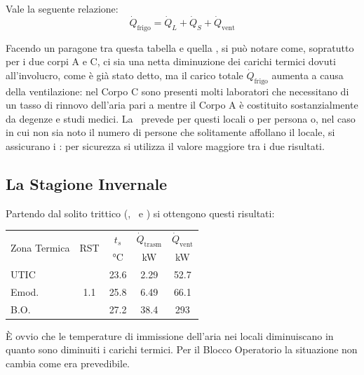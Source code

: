 Vale la seguente relazione:
\begin{equation}
	\dot{Q}_{\mathrm{frigo}}=\dot{Q}_L+\dot{Q}_S+\dot{Q}_{\mathrm{vent}}
\end{equation}

Facendo un paragone tra questa tabella e quella , si può notare come, sopratutto per i due corpi A e C, ci sia una netta diminuzione dei carichi termici dovuti all'involucro, come è già stato detto, ma il carico totale $\dot{Q}_{\mathrm{frigo}}$ aumenta a causa della ventilazione: nel Corpo C sono presenti molti laboratori che necessitano di un tasso di rinnovo dell'aria pari a  mentre il Corpo A è costituito sostanzialmente da degenze e studi medici. La \norvent\ prevede per questi locali o  per persona o, nel caso in cui non sia noto il numero di persone che solitamente affollano il locale, si assicurano i : per sicurezza si utilizza il valore maggiore tra i due risultati.

\subsection{La Stagione Invernale}
Partendo dal solito trittico (\utic, \emod\ e \blocc) si ottengono questi risultati:
\begin{center}
	\label{UTA:potenzaPROGETTO}
	\begin{tabular}{lcccc}
		\toprule
		\multirow{2}{*}{Zona Termica}				& \multirow{2}{*}{RST}	&	$t_s$ 					& $\dot{Q}_{\mathrm{trasm}}$	&	$\dot{Q}_{\mathrm{vent}}$	\\
							&						&	\si{\degreeCelsius} &	\si{kW}				&	\si{kW}\\
		\midrule
		UTIC			&\multirow{3}{*}{1.1}	&	\num{23.6}	&\num{2.29}		&	\num{52.7}\\
		Emod.			&						&	\num{25.8}	&\num{6.49}		&	\num{66.1}\\
		B.O.			&						&	\num{27.2}	&\num{38.4}		&	\num{293}\\
		\bottomrule
	\end{tabular}
\end{center}
È ovvio che le temperature di immissione dell'aria nei locali diminuiscano in quanto sono diminuiti i carichi termici. Per il Blocco Operatorio la situazione non cambia come era prevedibile. 

